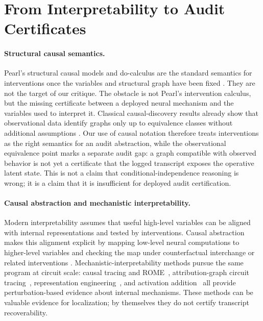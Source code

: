   \section{From Interpretability to Audit Certificates}
  \label{sec:related}

  \paragraph{Structural causal semantics.}
  Pearl's structural causal models and do-calculus are the standard semantics
  for interventions once the variables and structural graph have been fixed
  \citep{pearl2009causality}. They are not the target of our critique. The
  obstacle is not Pearl's intervention calculus, but the missing certificate
  between a deployed neural mechanism and the variables used to interpret it.
  Classical causal-discovery results already show that observational data
  identify graphs only up to equivalence classes without additional assumptions
  \citep{verma1990equivalence,spirtes2000causation}. Our use of causal notation
  therefore treats interventions as the right semantics for an audit
  abstraction, while the observational equivalence point marks a separate audit
  gap: a graph compatible with observed behavior is not yet a certificate that
  the logged transcript exposes the operative latent state. This is not a claim
  that conditional-independence reasoning is wrong; it is a claim that it is
  insufficient for deployed audit certification.

  \paragraph{Causal abstraction and mechanistic interpretability.}
  Modern interpretability assumes that useful high-level variables can be
  aligned with internal representations and tested by interventions. Causal
  abstraction makes this alignment explicit by mapping low-level neural
  computations to higher-level variables and checking the map under
  counterfactual interchange or related interventions
  \citep{geiger2021causal,geiger2025causal}. Mechanistic-interpretability
  methods pursue the same program at circuit scale: causal tracing and
  ROME~\citep{meng2022locating}, attribution-graph circuit
  tracing~\citep{lindsey2025biology}, representation
  engineering~\citep{zou2023representation}, and activation
  addition~\citep{turner2023activation} all provide perturbation-based evidence
  about internal mechanisms. These methods can be valuable evidence for
  localization; by themselves they do not certify transcript recoverability.

